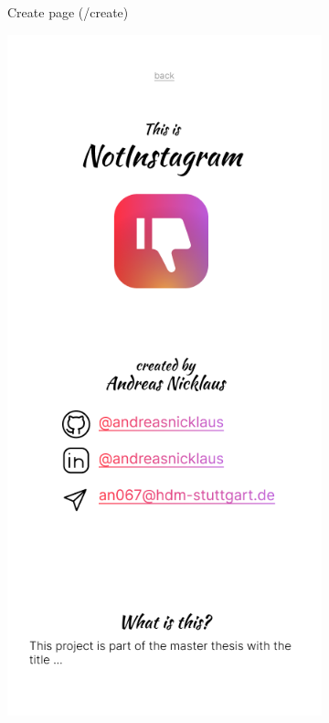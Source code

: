 \documentclass[a4paper, 12pt]{article}
\begin{document}
\begin{figure}[ht!]
\begin{subfigure}{0.49\linewidth}
\begin{center}
    \end{center}
    \caption{Create page (/create)}\label{subfig:create}
  \end{subfigure}
  \begin{subfigure}{0.49\linewidth}
    \begin{center}
      \includegraphics[width=\linewidth, height=0.3\textheight, keepaspectratio,frame]{img/ig-clone/Informationsseite.png}

\end{center}
\end{subfigure}
\end{figure}
\end{document}
